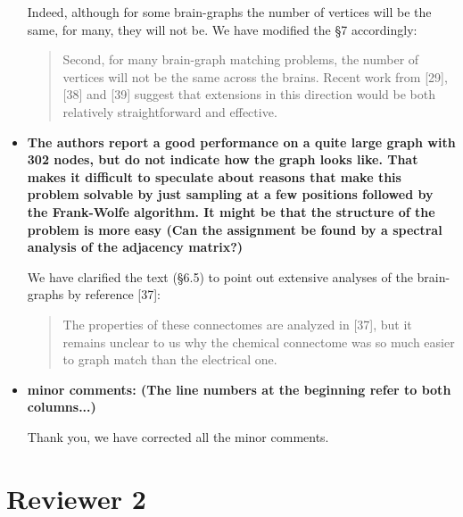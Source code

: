 \documentclass[11pt]{article}
\begin{document}
\begin{itemize}
Indeed, although for some brain-graphs the number of vertices will be the same, for many, they will not be.  We have modified the \S 7 accordingly:

 	\begin{quote}
		Second, for many brain-graph matching problems, the number of vertices will not be the same across the brains.  Recent work from [29],[38]  and [39] suggest that extensions in this direction would be both relatively straightforward and effective. 
	\end{quote}

	\item \textbf{The authors report a good performance on a quite large graph with
302 nodes, but do not indicate how the graph looks like. That
makes it difficult to speculate about reasons that make this problem
solvable by just sampling at a few positions followed by the Frank-Wolfe
algorithm. It might be that the structure of the problem is
more easy (Can the assignment be found by a spectral analysis of the
adjacency matrix?)
}

We have clarified the text (\S 6.5) to point out extensive analyses of the brain-graphs by reference [37]:

	\begin{quote}
		The properties of these connectomes are analyzed in [37], but it remains unclear to us why the chemical connectome was so much easier to graph match than the electrical one.
	\end{quote}
		

	\item \textbf{minor comments: (The line numbers at the beginning refer to both columns...)
}

Thank you, we have corrected all the minor comments.

\end{itemize}


\newpage
\section{Reviewer 2} %
\label{sec:reviewer_2}
\end{document}
